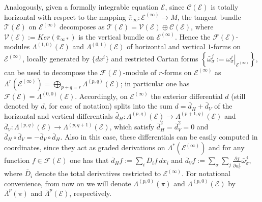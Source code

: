 \documentclass[12pt,english]{elsarticle}
\theoremstyle{plain}
\theoremstyle{plain}
\theoremstyle{remark}
\theoremstyle{plain}
\theoremstyle{definition}
\theoremstyle{definition}
\begin{document}
Analogously, given a formally integrable equation $\mathcal{E}$, since
$\mathcal{C}(\mathcal{E})$ is totally horizontal with respect to the mapping
$\bar{\pi}_{\infty}:\mathcal{E}^{(\infty )}\rightarrow M$, the tangent
bundle $\mathcal{T}\left (\mathcal{E}\right )$ on
$\mathcal{E}^{(\infty )}$ decomposes as
$\mathcal{T}\left (\mathcal{E}\right )=\mathcal{V}(\mathcal{E})
\oplus \mathcal{C}(\mathcal{E})$, where
$\mathcal{V}(\mathcal{E}):=Ker\left (\bar{\pi}_{\infty *}\right )$ is the
vertical bundle on $\mathcal{E}^{(\infty )}$. Hence the
$\mathcal{F}(\mathcal{E})$-modules $\Lambda ^{(1,0)}(\mathcal{E})$ and
$\Lambda ^{(0,1)}(\mathcal{E})$ of horizontal and vertical $1$-forms on
$\mathcal{E}^{(\infty )}$, locally generated by $\{dx^{i}\}$ and restricted
Cartan forms
$\left \{ \bar{\omega}_{\sigma}^{j}:=\left .\omega _{\sigma}^{j}
\right |_{\mathcal{E}^{(\infty )}}\right \} $, can be used to decompose
the $\mathcal{F}(\mathcal{E})$-module of $r$-forms on
$\mathcal{E}^{(\infty )}$ as
$\Lambda ^{r}\left (\mathcal{E}^{(\infty )}\right )=\bigoplus _{p+q=r}
\Lambda ^{(p,q)}\left (\mathcal{E}\right )$; in particular one has
$\mathcal{F}(\mathcal{E})=\Lambda ^{(0,0)}(\mathcal{E})$. Accordingly,
on $\mathcal{E}^{(\infty )}$ the exterior differential $d$ (still denoted
by $d$, for ease of notation) splits into the sum
$d=\bar{d}_{H}+\bar{d}_{V}$ of the horizontal and vertical differentials
$\bar{d}_{H}:\Lambda ^{(p,q)}(\mathcal{E})\rightarrow \Lambda ^{(p+1,q)}(
\mathcal{E})$ and
$\bar{d}_{V}:\Lambda ^{(p,q)}(\mathcal{E})\rightarrow \Lambda ^{(p,q+1)}(
\mathcal{E})$, which satisfy $\bar{d}_{H}^{2}=\bar{d}_{V}^{2}=0$ and
$\bar{d}_{H}\circ \bar{d}_{V}=-\bar{d}_{V}\circ \bar{d}_{H}$. Also in this
case, these differentials can be easily computed in coordinates, since
they act as graded derivations on
$\Lambda ^{*}(\mathcal{E}^{(\infty )})$ and for any function
$f\in \mathcal{F}(\mathcal{E})$ one has that
$\bar{d}_{H}f:=\sum _{i}\bar{D}_{i}f\,dx_{i}$ and
$\bar{d}_{V}f:=\sum _{\sigma}\sum _{j}
\frac{\partial f}{\partial u_{\sigma}^{j}}\bar{\omega}_{\sigma}^{j}$, where
$\bar{D}_{i}$ denote the total derivatives restricted to
$\mathcal{E}^{(\infty )}$. For notational convenience, from now on we will
denote $\Lambda ^{(p,0)}(\pi )$ and $\Lambda ^{(p,0)}(\mathcal{E})$ by
$\bar{\Lambda}^{p}(\pi )$ and $\bar{\Lambda}^{p}(\mathcal{E})$, respectively.
\end{document}
